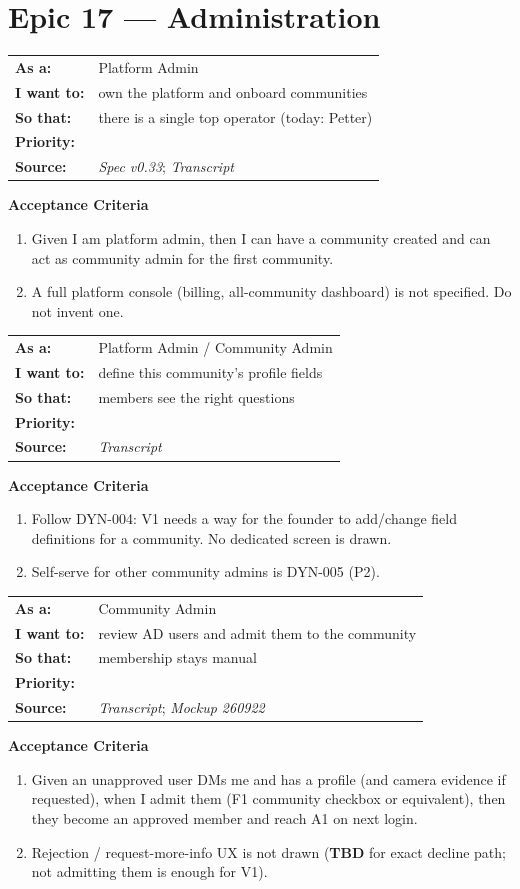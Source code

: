 \documentclass[11pt,a4paper]{article}
\makeatletter
\newcommand{\priPzero}{\colorbox{p0}{\makebox[4.6em]{\textcolor{white}{\scriptsize\bfseries P0 V1}}}}
\newcommand{\srcSpec}{\textit{Spec v0.33}}
\newcommand{\srcTx}{\textit{Transcript}}
\newcommand{\srcMock}{\textit{Mockup 260922}}
\newenvironment{story}[1]{%
  \Needspace{10\baselineskip}%
  \vspace{0.7em}%
  \noindent
  \colorbox{navy}{\makebox[\dimexpr\textwidth-2\fboxsep\relax][l]{\textcolor{white}{\bfseries\ #1}}}%
  \par\vspace{0.35em}%
}{\par\vspace{0.55em}}
\newcommand{\storymeta}[5]{%
  \noindent
  \begin{tabularx}{\textwidth}{@{}>{\bfseries}l X@{}}
    As a: & #1 \\
    I want to: & #2 \\
    So that: & #3 \\
    Priority: & #4 \\
    Source: & #5 \\
  \end{tabularx}
  \par\vspace{0.3em}
}
\newcommand{\achead}{\noindent\textbf{Acceptance Criteria}\par}
\makeatother
\begin{document}
\section{Epic 17 --- Administration}

\begin{story}{ADMIN-001 --- Platform Admin responsibilities}
\storymeta{Platform Admin}{own the platform and onboard communities}{there is a single top operator (today: Petter)}{\priPzero}{\srcSpec; \srcTx}
\achead
\begin{enumerate}
  \item Given I am platform admin, then I can have a community created and can act as community admin for the first community.
  \item A full platform console (billing, all-community dashboard) is not specified. Do not invent one.
\end{enumerate}
\end{story}

\begin{story}{ADMIN-002 --- Community Admin configures this community's profile schema}
\storymeta{Platform Admin / Community Admin}{define this community's profile fields}{members see the right questions}{\priPzero}{\srcTx}
\achead
\begin{enumerate}
  \item Follow DYN-004: V1 needs a way for the founder to add/change field definitions for a community. No dedicated screen is drawn.
  \item Self-serve for other community admins is DYN-005 (P2).
\end{enumerate}
\end{story}

\begin{story}{ADMIN-003 --- Community Admin verifies and admits users}
\storymeta{Community Admin}{review AD users and admit them to the community}{membership stays manual}{\priPzero}{\srcTx; \srcMock}
\achead
\begin{enumerate}
  \item Given an unapproved user DMs me and has a profile (and camera evidence if requested), when I admit them (F1 community checkbox or equivalent), then they become an approved member and reach A1 on next login.
  \item Rejection / request-more-info UX is not drawn (\textbf{TBD} for exact decline path; not admitting them is enough for V1).
\end{enumerate}
\end{story}
\end{document}
